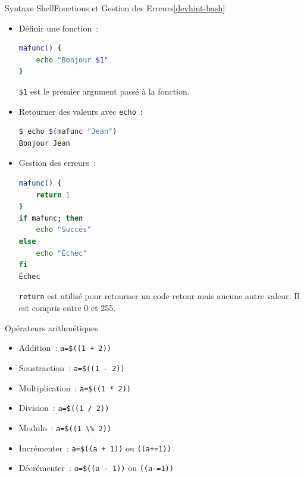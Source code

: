 \documentclass{beamer}
\begin{document}
    \begin{frame}[fragile]{Syntaxe Shell}{Fonctions et Gestion des Erreurs\cref{devhint-bash}}
        \begin{itemize}
            \item Définir une fonction~:
            \begin{lstlisting}[language=bash,basicstyle=\ttfamily\tiny]
mafunc() {
    echo "Bonjour $1"
}
            \end{lstlisting}
            \lstinline{$1} est le premier argument passé à la fonction.
            \item Retourner des valeurs avec \lstinline{echo}~:
            \begin{lstlisting}[language=bash,basicstyle=\ttfamily\tiny]
$ echo $(mafunc "Jean")
Bonjour Jean
            \end{lstlisting}
            \item Gestion des erreurs~:
            \begin{lstlisting}[language=bash,basicstyle=\ttfamily\tiny]
mafunc() {
    return 1
}
if mafunc; then
    echo "Succès"
else
    echo "Échec"
fi
Échec
            \end{lstlisting}
            \lstinline{return} est utilisé pour retourner un code retour mais aucune autre valeur.
            Il est compris entre 0 et 255.
        \end{itemize}
    \end{frame}

    \begin{frame}[fragile]{Opérateurs arithmétiques}
        \begin{itemize}
            \item Addition~: \lstinline{a=$((1 + 2))}
            \item Soustraction~: \lstinline{a=$((1 - 2))}
            \item Multiplication~: \lstinline{a=$((1 * 2))}
            \item Division~: \lstinline{a=$((1 / 2))}
            \item Modulo~: \lstinline{a=$((1 \% 2))}
            \item Incrémenter~: \lstinline{a=$((a + 1))} ou \lstinline{((a+=1))}
            \item Décrémenter~: \lstinline{a=$((a - 1))} ou \lstinline{((a-=1))}
        \end{itemize}
    \end{frame}
\end{document}
